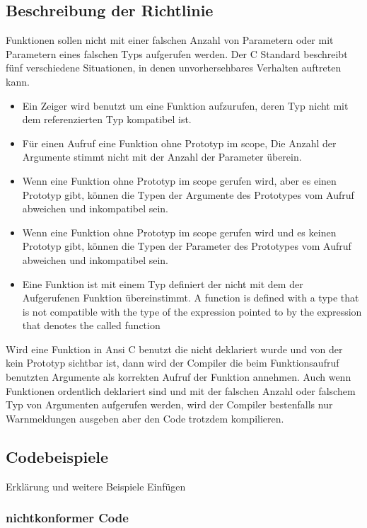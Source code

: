 \documentclass[12pt]{article}
\begin{document}
\subsection{Beschreibung der Richtlinie}
Funktionen sollen nicht mit einer falschen Anzahl von Parametern oder mit Parametern eines falschen Typs aufgerufen werden.
Der C Standard beschreibt fünf verschiedene Situationen, in denen unvorhersehbares Verhalten auftreten kann. 
\begin{itemize}
    \item Ein Zeiger wird benutzt um eine Funktion aufzurufen, deren Typ nicht mit dem referenzierten Typ kompatibel ist.
    \item Für einen Aufruf eine Funktion ohne Prototyp im scope, Die Anzahl der Argumente stimmt nicht mit der Anzahl der Parameter überein.
    \item Wenn eine Funktion ohne Prototyp im scope gerufen wird, aber es einen Prototyp gibt, können die Typen der Argumente des Prototypes vom Aufruf abweichen und inkompatibel sein.
    \item Wenn eine Funktion ohne Prototyp im scope gerufen wird und es keinen Prototyp gibt, können die Typen der Parameter des Prototypes vom Aufruf abweichen und inkompatibel sein.
    \item Eine Funktion ist mit einem Typ definiert der nicht mit dem der Aufgerufenen Funktion übereinstimmt.
    A function is defined with a type that is not compatible with the type of the expression pointed to by the expression that denotes the called function
\end{itemize}

Wird eine Funktion in Ansi C benutzt die nicht deklariert wurde und von der kein Prototyp sichtbar ist, dann wird der Compiler die beim Funktionsaufruf benutzten Argumente als korrekten Aufruf der Funktion annehmen. Auch wenn Funktionen ordentlich deklariert sind und mit der falschen Anzahl oder falschem Typ von Argumenten aufgerufen werden, wird der Compiler bestenfalls nur Warnmeldungen ausgeben aber den Code trotzdem kompilieren.


\subsection{Codebeispiele}
Erklärung und weitere Beispiele Einfügen
\subsubsection{nichtkonformer Code}

\end{document}
